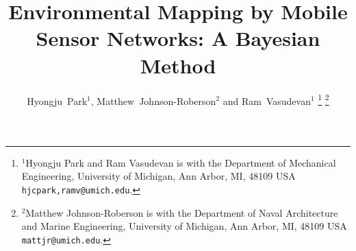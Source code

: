 \documentclass[letterpaper, 10 pt, conference]{ieeeconf}
\begin{document}
	
	

%
\title{\LARGE \bf
	 Environmental Mapping by Mobile Sensor Networks: A Bayesian Method
}
%
%
%

\author{Hyongju~Park${}^1$, Matthew~Johnson-Roberson${}^2$ and Ram~Vasudevan${}^1$
\thanks{${}^1$Hyongju Park and Ram Vasudevan is with the Department
	of Mechanical Engineering, University of Michigan, Ann Arbor,
	MI, 48109 USA {\tt\small hjcpark,ramv@umich.edu}.}%
\thanks{${}^2$Matthew Johnson-Roberson is with the Department of Naval Architecture and Marine Engineering, University of Michigan, Ann Arbor,
	MI, 48109 USA {\tt\small mattjr@umich.edu}.}%
}%





% 
%
\end{document}
